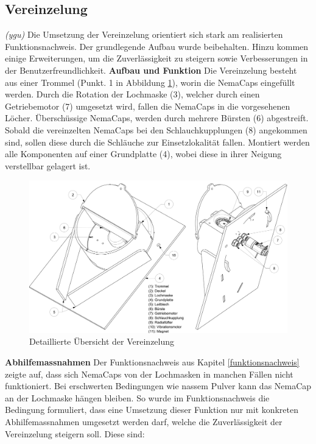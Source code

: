 \subsection{Vereinzelung}
\textit{(ygu)} Die Umsetzung der Vereinzelung orientiert sich stark am realisierten Funktionsnachweis. Der grundlegende Aufbau wurde beibehalten. Hinzu kommen einige Erweiterungen, um die Zuverlässigkeit zu steigern sowie Verbesserungen in der Benutzerfreundlichkeit.
\newline
\newline
\textbf{Aufbau und Funktion}
\newline
Die Vereinzelung besteht aus einer Trommel (Punkt. 1 in Abbildung \ref{fig:details_vereinzelung}), worin die NemaCaps eingefüllt werden. Durch die Rotation der Lochmaske (3), welcher durch einen Getriebemotor (7) umgesetzt wird, fallen die NemaCaps in die vorgesehenen Löcher. Überschüssige NemaCaps, werden durch mehrere Bürsten (6) abgestreift. Sobald die vereinzelten NemaCaps bei den Schlauchkupplungen (8) angekommen sind, sollen diese durch die Schläuche zur Einsetzlokalität fallen. Montiert werden alle Komponenten auf einer Grundplatte (4), wobei diese in ihrer Neigung verstellbar gelagert ist.
	\begin{figure}[H]
	\includegraphics[scale=0.45]{Illustrationen/6-Umsetzung/details_vereinzelung.jpg}
	\caption{Detaillierte Übersicht der Vereinzelung}
	\label{fig:details_vereinzelung}
	\end{figure}
\textbf{Abhilfemassnahmen}
\newline
Der Funktionsnachweis aus Kapitel \ref{funktionsnachweis} zeigte auf, dass sich NemaCaps von der Lochmasken in manchen Fällen nicht funktioniert. Bei erschwerten Bedingungen wie nassem Pulver kann das NemaCap an der Lochmaske hängen bleiben. So wurde im Funktionsnachweis die Bedingung formuliert, dass eine Umsetzung dieser Funktion nur mit konkreten Abhilfemassnahmen umgesetzt werden darf, welche die Zuverlässigkeit der Vereinzelung steigern soll. Diese sind:
